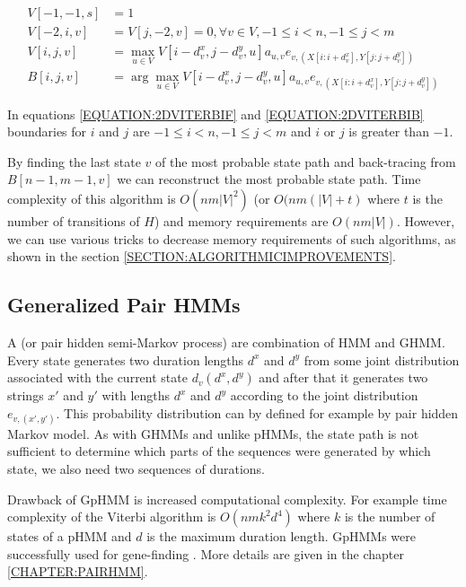 \begin{align}
V[-1,-1,s] &= 1\\
V[-2,i,v] &= V[j,-2,v] = 0, \forall v\in V,-1 \leq i < n, -1\leq j < m\\
V[i,j,v] &= \max_{u\in
V}V[i-d^x_{v},j-d^y_v,u]a_{u,v}e_{v,(X[i:i+d^x_v],Y[j:j+d^y_v])}\label{EQUATION:2DVITERBIF}\\
B[i,j,v] &= \arg\max_{u\in
V}V[i-d^x_{v},j-d^y_v,u]a_{u,v}e_{v,(X[i:i+d^x_v],Y[j:j+d^y_v])}\label{EQUATION:2DVITERBIB}
\end{align}

In equations \ref{EQUATION:2DVITERBIF} and \ref{EQUATION:2DVITERBIB} boundaries for $i$ and $j$ are $
-1\leq i< n,-1\leq j< m$ and $i$ or $j$ is greater than $-1$.


By finding the last state $v$ of the most probable state path and back-tracing
from $B[n-1,m-1,v]$ we can reconstruct the most probable state path. Time
complexity of this algorithm is $O(nm|V|^2)$ (or $O(nm(|V|+t)$ where $t$ is the
number of transitions of $H$) and memory requirements are $O(nm|V|)$. However,
we can use various tricks to decrease memory requirements of such algorithms, as
shown in the section \ref{SECTION:ALGORITHMICIMPROVEMENTS}.

\subsection{Generalized Pair HMMs}


A  (or pair hidden semi-Markov
process) are combination of HMM and GHMM. Every state generates two
duration lengths $d^x$ and $d^y$ from some joint distribution associated with
the current state $d_v(d^x,d^y)$ and after that it generates two strings $x'$
and $y'$ with lengths $d^x$ and $d^y$ according to the joint distribution
$e_{v,(x',y')}$. This probability distribution can by defined for example by
pair hidden Markov model.  As with GHMMs and unlike pHMMs, the state path is not
sufficient to determine which parts of the sequences were generated by which
state, we also need two sequences of durations.

Drawback of GpHMM is increased computational complexity. For example time
complexity of the Viterbi algorithm is $O(nmk^2d^4)$\cite{Meyer2002} where $k$
is the number of states of a pHMM and $d$ is the maximum duration length.
GpHMMs were successfully used for gene-finding
\cite{SLAM2003,Alexanderson2004,Majoros2005,Meyer2002}. More details are given in
the chapter \ref{CHAPTER:PAIRHMM}.



